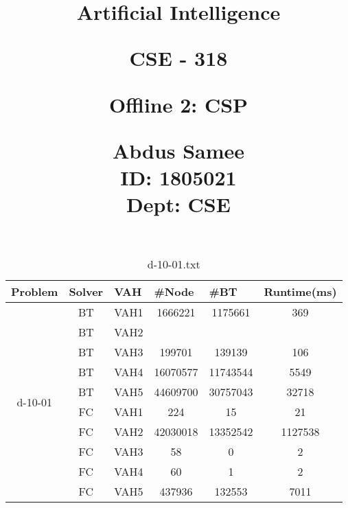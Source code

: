\documentclass{article}
\title{%
  \begin{center}
        \vspace*{1cm}
            
        \Huge
        \textbf{Artificial Intelligence}
            
        \vspace{0.5cm}
        \LARGE
        CSE - 318
            
        \vspace{1.5cm}
            
        \textbf{Offline 2: CSP}
                        
        \vspace{0.8cm}
                        
        \Large
        Abdus Samee\\
        ID: 1805021\\
        Dept: CSE\\
    \end{center}
  }
\begin{document}
\maketitle
\newpage

\begin{table}[]
\caption{d-10-01.txt}
\begin{tabular}{|c|c|c|c|c|c|}
\hline
Problem                   & Solver & \multicolumn{1}{l|}{VAH} & \multicolumn{1}{l|}{\#Node} & \multicolumn{1}{l|}{\#BT} & \multicolumn{1}{l|}{Runtime(ms)} \\ \hline
\multirow{10}{*}{d-10-01} & BT     & VAH1                     & 1666221                     & 1175661                   & 369                              \\ \cline{2-6} 
 & BT & VAH2 &          &           &       \\ \cline{2-6} 
 & BT & VAH3 & 199701   & 139139    & 106   \\ \cline{2-6} 
 & BT & VAH4 & 16070577 & 11743544  & 5549  \\ \cline{2-6} 
 & BT & VAH5 & 44609700 & 30757043  & 32718 \\ \cline{2-6} 
 & FC & VAH1 & 224      & 15        & 21    \\ \cline{2-6} 
 & FC & VAH2 & 42030018 & 13352542  & 1127538  \\ \cline{2-6} 
 & FC & VAH3 & 58       & 0         & 2     \\ \cline{2-6} 
 & FC & VAH4 & 60       & 1         & 2     \\ \cline{2-6} 
 & FC & VAH5 & 437936   & 132553         & 7011      \\ \hline
\end{tabular}
\end{table}
\end{document}

